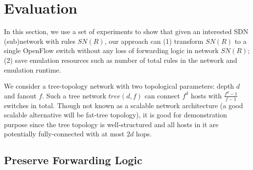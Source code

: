 \section{Evaluation}
In this section, we use a set of experiments to show that
given an interested SDN (sub)network with rules $SN(R)$, our approach can 
(1) transform $SN(R)$ to a single OpenFlow switch without any loss of forwarding logic in network $SN(R)$;
(2) save emulation resources such as number of total rules in the network and emulation runtime.

We consider a tree-topology network with two topological parameters: depth $d$ and fanout $f$.
Such a tree network $tree(d, f)$ can connect $f^d$ hosts with $\frac{f^d - 1}{f-1}$ switches in total.
Though not known as a scalable network architecture
(a good scalable alternative will be fat-tree topology),
it is good for demonstration purpose since the tree topology is well-structured and
all hosts in it are potentially fully-connected with at most $2d$ hops.

\subsection{Preserve Forwarding Logic}
\label{SubSec:PreserveForwardingLogic}

